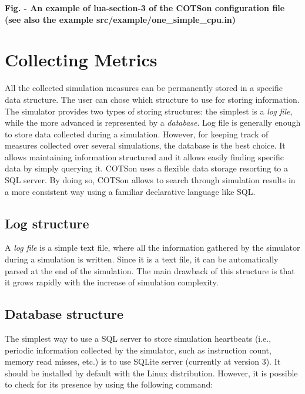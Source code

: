 \documentclass[a4paper]{article}
\newcounter{Figure}
\renewcommand\theFigure{\arabic{Figure}}
\begin{document}
{\centering{}\sffamily\bfseries
\label{bkm:Ref388170491}Fig.
\stepcounter{Figure}{\theFigure} - An example of lua-section-3 of the
COTSon configuration file (see also the example
src/example/one\_simple\_cpu.in)
\par}

\section[Collecting Metrics]{Collecting Metrics}
{
All the collected simulation measures can be permanently stored in a
specific data structure. The user can chose which structure to use for
storing information. The simulator provides two types of storing
structures: the simplest is a \textit{log file}, while the more
advanced is represented by a \textit{database}. Log file is generally
enough to store data collected during a simulation. However, for
keeping track of measures collected over several simulations, the
database is the best choice. It allows maintaining information
structured and it allows easily finding specific data by simply
querying it. COTSon uses a flexible data storage resorting to a SQL
server. By doing so, COTSon allows to search through simulation results
in a more consistent way using a familiar declarative language like
SQL.}

\subsection[Log structure]{Log structure}
{
A \textit{log file} is a simple text file, where all the information
gathered by the simulator during a simulation is written. Since it is a
text file, it can be automatically parsed at the end of the simulation.
The main drawback of this structure is that it grows rapidly with the
increase of simulation complexity. }

\subsection[Database structure]{Database structure}
\label{bkm:Ref388175692}\label{bkm:Ref388175687}{
The simplest way to use a SQL server to store simulation heartbeats
(i.e., periodic information collected by the simulator, such as
instruction count, memory read misses, etc.) is to use SQLite server
(currently at version 3). It should be installed by default with the
Linux distribution. However, it is possible to check for its presence
by using the following command:}
\end{document}
